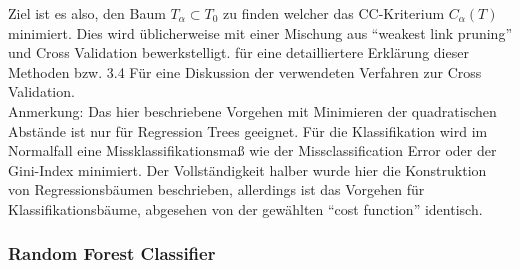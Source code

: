Ziel ist es also, den Baum $T_{\alpha} \subset T_{0}$ zu finden welcher das CC-Kriterium $ C_{\alpha}(T)$ minimiert. Dies wird üblicherweise mit einer Mischung aus ``weakest link pruning'' und Cross Validation bewerkstelligt. \cite{treesplit} für eine detailliertere Erklärung dieser Methoden bzw. 3.4 Für eine Diskussion der verwendeten Verfahren zur Cross Validation. \\
Anmerkung: Das hier beschriebene Vorgehen mit Minimieren der quadratischen Abstände ist nur für Regression Trees geeignet. Für die Klassifikation wird im Normalfall eine Missklassifikationsmaß wie der Missclassification Error oder der Gini-Index minimiert. Der Vollständigkeit halber wurde hier die Konstruktion von Regressionsbäumen beschrieben, allerdings ist das Vorgehen für Klassifikationsbäume, abgesehen von der gewählten ``cost function'' identisch. 

\subsubsection{Random Forest Classifier}

